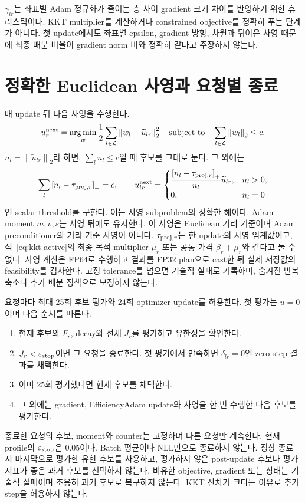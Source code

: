 \documentclass[11pt]{article}
\newcommand{\norm}[1]{\left\lVert #1\right\rVert}
\newcommand{\pos}[1]{\left[#1\right]_+}
\begin{document}
$\gamma_{lr}$는 좌표별 Adam 정규화가 줄이는 층 사이 gradient 크기
차이를 반영하기 위한 휴리스틱이다. KKT multiplier를 계산하거나
constrained objective를 정확히 푸는 단계가 아니다. 첫 update에서도
좌표별 epsilon, gradient 방향, 차원과 뒤이은 사영 때문에 최종 배분
비율이 gradient norm 비와 정확히 같다고 주장하지 않는다.

\section{정확한 Euclidean 사영과 요청별 종료}
매 update 뒤 다음 사영을 수행한다.
\begin{equation}
 u^{\rm next}_r=\mathop{\arg\min}_{w}
 \frac12\sum_{l\in\mathcal L}\norm{w_l-\widetilde u_{lr}}_2^2
 \quad\text{subject to}\quad
 \sum_{l\in\mathcal L}\norm{w_l}_2\le c.
 \label{eq:projection}
\end{equation}
$n_l=\norm{\widetilde u_{lr}}_2$라 하면, $\sum_l n_l\le c$일 때
후보를 그대로 둔다. 그 외에는
\begin{equation}
 \sum_l\pos{n_l-\tau_{{\rm proj},r}}=c,\qquad
 u^{\rm next}_{lr}=\begin{cases}
 \displaystyle\frac{\pos{n_l-\tau_{{\rm proj},r}}}{n_l}\widetilde u_{lr},
     & n_l>0,\\
 0,& n_l=0
 \end{cases}
 \label{eq:threshold}
\end{equation}
인 scalar threshold를 구한다. 이는 사영 subproblem의 정확한 해이다.
Adam moment $m,v,s$는 사영 뒤에도 유지한다.
이 사영은 Euclidean 거리 기준이며 Adam preconditioner의 거리 기준
사영이 아니다. $\tau_{{\rm proj},r}$는 한 update의 사영 임계값이고,
식~\eqref{eq:kkt-active}의 최종 목적 multiplier $\mu_r$ 또는 공통
가격 $\beta_r+\mu_r$와 같다고 둘 수 없다.
사영 계산은 FP64로 수행하고 결과를 FP32 plan으로 cast한 뒤 실제
저장값의 feasibility를 검사한다. 고정 tolerance를 넘으면 기술적 실패로
기록하며, 숨겨진 반복 축소나 추가 배분 정책으로 보정하지 않는다.

요청마다 최대 25회 후보 평가와 24회 optimizer update를 허용한다.
첫 평가는 $u=0$이며 다음 순서를 따른다.
\begin{enumerate}
 \item 현재 후보의 $F_r$, decay와 전체 $J_r$를 평가하고 유한성을 확인한다.
 \item $J_r<\varepsilon_{\rm stop}$이면 그 요청을 종료한다. 첫 평가에서 만족하면
       $\delta_{lr}=0$인 zero-step 결과를 채택한다.
 \item 이미 25회 평가했다면 현재 후보를 채택한다.
 \item 그 외에는 gradient, EfficiencyAdam update와 사영을 한 번 수행한
       다음 후보를 평가한다.
\end{enumerate}
종료한 요청의 후보, moment와 counter는 고정하며 다른 요청만 계속한다.
현재 profile의 $\varepsilon_{\rm stop}$은 $0.05$이다.
Batch 평균이나 NLL만으로 종료하지 않는다. 정상 종료 시 마지막으로
평가한 유한 후보를 사용하고, 평가하지 않은 post-update 후보나
평가 지표가 좋은 과거 후보를 선택하지 않는다. 비유한 objective,
gradient 또는 상태는 기술적 실패이며 조용히 과거 후보로 복구하지
않는다. KKT 잔차가 크다는 이유로 추가 step을 허용하지 않는다.
\end{document}
